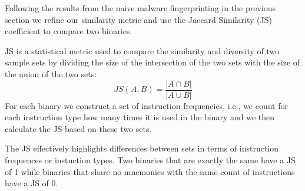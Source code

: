 \documentclass[letterpaper,twocolumn,10pt]{article}
\begin{document}
Following the results from the naive malware fingerprinting in the previous
section we refine our similarity metric and use the Jaccard Similarity (JS)
coefficient to compare two binaries.

JS is a statistical metric used to compare the similarity and diversity of 
two sample sets by dividing the size of the intersection of the two sets with 
the size of the union of the two sets:
\[
JS(A, B) = \frac{| A \cap B |}{|A \cup B|}
\]
For each binary we construct a set of instruction frequencies, i.e., we
count for each instruction type how many times it is used in the binary and we
then calculate the JS based on these two sets.



The JS effectively highlights differences between sets in terms of instruction
frequences or instuction types. Two binaries that are exactly the same have a JS
of 1 while binaries that share no mnemonics with the same count of instructions
have a JS of 0.
\end{document}

